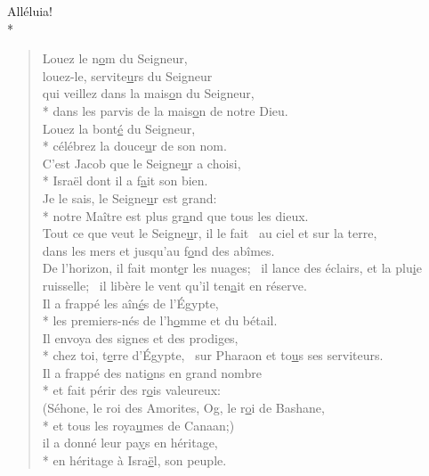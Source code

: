 Alléluia! \\*

\begin{verse}
Louez le n\underline{o}m du Seigneur, \\
louez-le, servite\underline{u}rs du Seigneur \\
qui veillez dans la mais\underline{o}n du Seigneur, \\*
dans les parvis de la mais\underline{o}n de notre Dieu. \\

Louez la bont\underline{é} du Seigneur, \\*
célébrez la douce\underline{u}r de son nom. \\
C’est Jacob que le Seigne\underline{u}r a choisi, \\*
Israël dont il a f\underline{a}it son bien. \\

Je le sais, le Seigne\underline{u}r est grand: \\*
notre Maître est plus gr\underline{a}nd que tous les dieux. \\
Tout ce que veut le Seigne\underline{u}r, il le fait~\psalmstar
au ciel et sur la terre, \\
dans les mers et jusqu’au f\underline{o}nd des abîmes. \\

De l’horizon, il fait mont\underline{e}r les nuages;~\psalmdagger
il lance des éclairs, et la plu\underline{i}e ruisselle;~\psalmstar
il libère le vent qu’il ten\underline{a}it en réserve. \\

Il a frappé les aîn\underline{é}s de l’Égypte, \\*
les premiers-nés de l’h\underline{o}mme et du bétail. \\
Il envoya des signes et des prodiges, \\*
chez toi, t\underline{e}rre d’Égypte,~\psalmstar
sur Pharaon et to\underline{u}s ses serviteurs. \\

Il a frappé des nati\underline{o}ns en grand nombre \\*
et fait périr des r\underline{o}is valeureux: \\
(Séhone, le roi des Amorites, Og, le r\underline{o}i de Bashane, \\*
et tous les roya\underline{u}mes de Canaan;) \\
il a donné leur pa\underline{y}s en héritage, \\*
en héritage à Isra\underline{ë}l, son peuple. \\


\end{verse}
